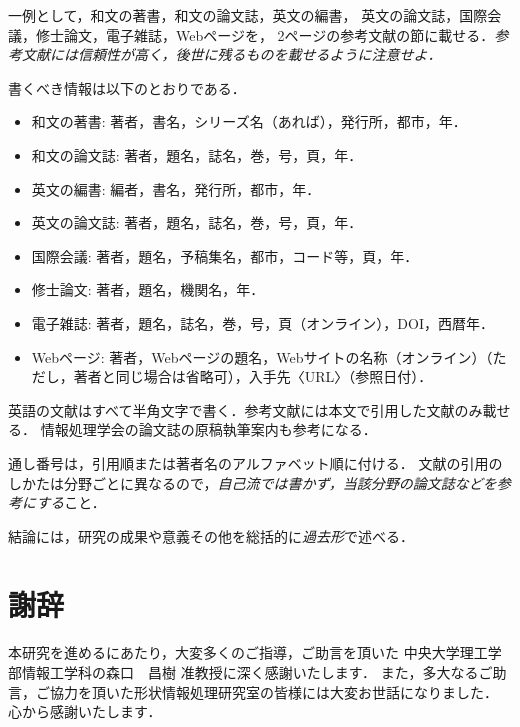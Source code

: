 \documentclass[a4j,12pt]{jreport}
\def\syaji{ \chapter*{謝辞} \addcontentsline{toc}{chapter}{謝辞}}
\begin{document}

一例として，和文の著書\cite{suetake}，和文の論文誌\cite{kusano}，英文の編書\cite{fuortes}，
英文の論文誌\cite{rice}，国際会議\cite{guibas}，修士論文\cite{chudai}，電子雑誌\cite{iwama}，Webページ\cite{IPSJ}を，
2ページの参考文献の節に載せる．{\em 参考文献には信頼性が高く，後世に残るものを載せるように注意せよ．}

書くべき情報は以下のとおりである．
\begin{itemize}
\item 和文の著書: 著者，書名，シリーズ名（あれば），発行所，都市，年．
\item 和文の論文誌: 著者，題名，誌名，巻，号，頁，年．
\item 英文の編書: 編者，書名，発行所，都市，年．
\item 英文の論文誌: 著者，題名，誌名，巻，号，頁，年．
\item 国際会議: 著者，題名，予稿集名，都市，コード等，頁，年．
\item 修士論文: 著者，題名，機関名，年．
\item 電子雑誌: 著者，題名，誌名，巻，号，頁（オンライン），DOI，西暦年．
\item Webページ: 著者，Webページの題名，Webサイトの名称（オンライン）（ただし，著者と同じ場合は省略可），入手先〈URL〉（参照日付）．
\end{itemize}
英語の文献はすべて半角文字で書く．参考文献には本文で引用した文献のみ載せる．
情報処理学会の論文誌の原稿執筆案内\cite{IPSJ}も参考になる．

通し番号は，引用順または著者名のアルファベット順に付ける．
文献の引用のしかたは分野ごとに異なるので，{\em 自己流では書かず，当該分野の論文誌などを参考にする}こと．





結論には，研究の成果や意義その他を総括的に{\em 過去形}で述べる．

\syaji
\par
本研究を進めるにあたり，大変多くのご指導，ご助言を頂いた
中央大学理工学部情報工学科の森口　昌樹 准教授に深く感謝いたします．
また，多大なるご助言，ご協力を頂いた形状情報処理研究室の皆様には大変お世話になりました．
心から感謝いたします．
\end{document}
